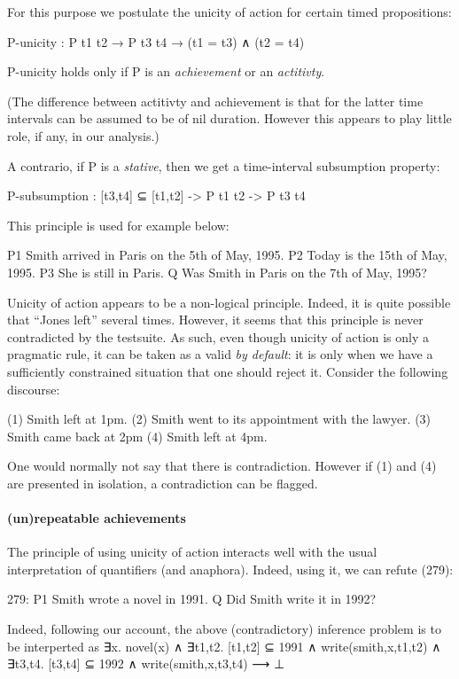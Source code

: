 \documentclass[a4paper,11pt]{article}
\begin{document}
For this purpose we postulate the unicity of action for certain timed
propositions:

P-unicity : P t1 t2 → P t3 t4 → (t1 = t3) ∧ (t2 = t4)

P-unicity holds only if P is an \emph{achievement} or an \emph{actitivty}.

(The difference between actitivty and achievement is that for the
latter time intervals can be assumed to be of nil duration. However
this appears to play little role, if any, in our analysis.)

A contrario, if P is a \emph{stative}, then we get a time-interval subsumption property:

P-subsumption : [t3,t4] ⊆ [t1,t2] -> P t1 t2 -> P t3 t4

This principle is used for example below:

P1	Smith arrived in Paris on the 5th of May, 1995.
P2	Today is the 15th of May, 1995.
P3	She is still in Paris.
Q 	Was Smith in Paris on the 7th of May, 1995? 

Unicity of action appears to be a non-logical principle. Indeed, it is
quite possible that ``Jones left'' several times. However, it seems
that this principle is never contradicted by the testsuite. As such,
even though unicity of action is only a pragmatic rule, it can be
taken as a valid \emph{by default}: it is only when we have a
sufficiently constrained situation that one should reject it. Consider
the following discourse:

(1) Smith left at 1pm.
(2) Smith went to its appointment with the lawyer.
(3) Smith came back at 2pm
(4) Smith left at 4pm.

One would normally not say that there is contradiction. However if (1)
and (4) are presented in isolation, a contradiction can be flagged.

\paragraph{(un)repeatable achievements}
The principle of using unicity of action interacts well with the usual interpretation of quantifiers (and anaphora).
Indeed, using it, we can refute (279):

279:
P1	Smith wrote a novel in 1991.
Q 	Did Smith write it in 1992?

Indeed, following our account, the above (contradictory) inference problem is to be
interperted as
∃x. novel(x) ∧
∃t1,t2. [t1,t2] ⊆ 1991 ∧ write(smith,x,t1,t2) ∧
∃t3,t4. [t3,t4] ⊆ 1992 ∧ write(smith,x,t3,t4)
⟶ ⊥
\end{document}
